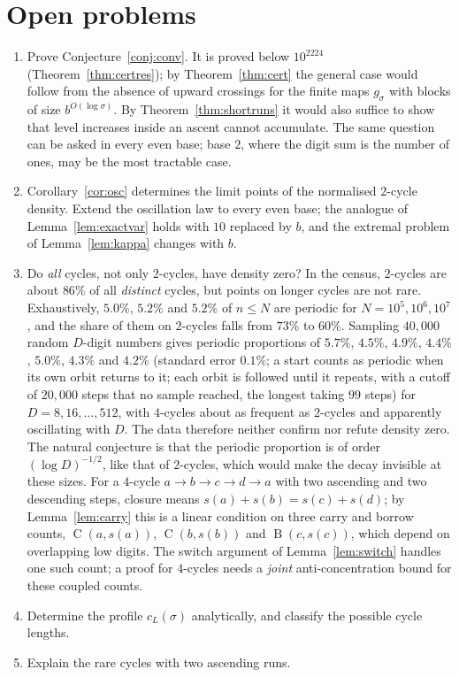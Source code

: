 \documentclass[11pt]{article}
\theoremstyle{definition}
\theoremstyle{remark}
\newcommand{\C}{\operatorname{C}}
\newcommand{\B}{\operatorname{B}}
\begin{document}
\clearpage
\section{Open problems}
\begin{enumerate}
\item Prove Conjecture~\ref{conj:conv}. It is proved below $10^{2224}$
  (Theorem~\ref{thm:certres}); by Theorem~\ref{thm:cert} the general case would
  follow from the absence of upward crossings for the finite maps $g_\sigma$
  with blocks of size $b^{O(\log\sigma)}$. By Theorem~\ref{thm:shortruns} it
  would also suffice to show that level increases inside an ascent cannot
  accumulate. The same question can be asked in every even base; base $2$,
  where the digit sum is the number of ones, may be the most tractable case.
\item Corollary~\ref{cor:osc} determines the limit points of the
  normalised $2$-cycle density. Extend the oscillation law to every even base;
  the analogue of Lemma~\ref{lem:exactvar} holds with $10$ replaced by $b$,
  and the extremal problem of Lemma~\ref{lem:kappa} changes with $b$.
\item Do \emph{all} cycles, not only $2$-cycles, have density zero? In the
  census, $2$-cycles are about $86\%$ of all \emph{distinct} cycles, but
  points on longer cycles are not rare. Exhaustively, $5.0\%$, $5.2\%$ and
  $5.2\%$ of $n\le N$ are periodic for $N=10^5,10^6,10^7$, and the share of
  them on $2$-cycles falls from $73\%$ to $60\%$. Sampling $40{,}000$ random
  $D$-digit numbers gives periodic proportions of $5.7\%$, $4.5\%$, $4.9\%$,
  $4.4\%$, $5.0\%$, $4.3\%$ and $4.2\%$ (standard error $0.1\%$; a start counts as periodic when its own orbit returns to it; each orbit is followed until it repeats, with a cutoff of $20{,}000$ steps that no sample reached, the longest taking $99$ steps) for
  $D=8,16,\dots,512$, with $4$-cycles about as frequent as $2$-cycles and
  apparently oscillating with $D$. The data therefore neither confirm nor
  refute density zero. The natural conjecture is that the periodic proportion
  is of order $(\log D)^{-1/2}$, like that of $2$-cycles, which would make the
  decay invisible at these sizes. For a $4$-cycle $a\to b\to c\to d\to a$ with two ascending and two
  descending steps, closure means $s(a)+s(b)=s(c)+s(d)$; by
  Lemma~\ref{lem:carry} this is a linear condition on three carry and borrow
  counts, $\C(a,s(a))$, $\C(b,s(b))$ and $\B(c,s(c))$, which depend on
  overlapping low digits. The switch argument of Lemma~\ref{lem:switch}
  handles one such count; a proof for $4$-cycles needs a \emph{joint}
  anti-concentration bound for these coupled counts.
\item Determine the profile $c_L(\sigma)$ analytically, and classify the
  possible cycle lengths.
\item Explain the rare cycles with two ascending runs.
\end{enumerate}
\end{document}
